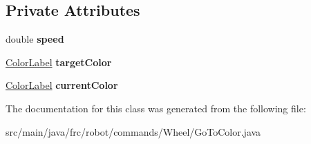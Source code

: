 \subsection*{Private Attributes}
\begin{DoxyCompactItemize}
\item 
\mbox{\label{classfrc_1_1robot_1_1commands_1_1_wheel_1_1_go_to_color_af8ef8a02713cfa9867f5d9b3d7e30766}} 
double {\bfseries speed}
\item 
\mbox{\label{classfrc_1_1robot_1_1commands_1_1_wheel_1_1_go_to_color_a8ce343e26eedfd0360057be077bdacba}} 
\mbox{\hyperlink{enumfrc_1_1robot_1_1enums_1_1_color_label}{Color\+Label}} {\bfseries target\+Color}
\item 
\mbox{\label{classfrc_1_1robot_1_1commands_1_1_wheel_1_1_go_to_color_a462885986d1ba6cbd216e153c423bff9}} 
\mbox{\hyperlink{enumfrc_1_1robot_1_1enums_1_1_color_label}{Color\+Label}} {\bfseries current\+Color}
\end{DoxyCompactItemize}


The documentation for this class was generated from the following file\+:\begin{DoxyCompactItemize}
\item 
src/main/java/frc/robot/commands/\+Wheel/Go\+To\+Color.\+java\end{DoxyCompactItemize}
